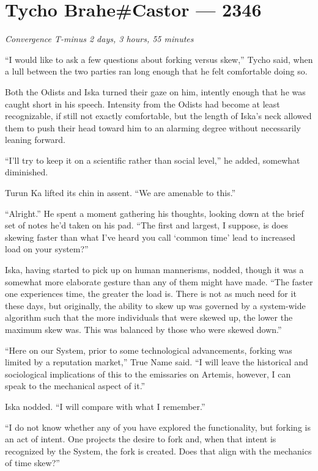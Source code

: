 \hypertarget{tycho-brahecastor-2346}{%
\chapter{Tycho Brahe\#Castor — 2346}}

\begin{center}
\emph{Convergence T-minus 2 days, 3 hours, 55 minutes}
\end{center}

\noindent ``I would like to ask a few questions about forking versus skew,'' Tycho said, when a lull between the two parties ran long enough that he felt comfortable doing so.

Both the Odists and Iska turned their gaze on him, intently enough that he was caught short in his speech. Intensity from the Odists had become at least recognizable, if still not exactly comfortable, but the length of Iska's neck allowed them to push their head toward him to an alarming degree without necessarily leaning forward.

``I'll try to keep it on a scientific rather than social level,'' he added, somewhat diminished.

Turun Ka lifted its chin in assent. ``We are amenable to this.''

``Alright.'' He spent a moment gathering his thoughts, looking down at the brief set of notes he'd taken on his pad. ``The first and largest, I suppose, is does skewing faster than what I've heard you call `common time' lead to increased load on your system?''

Iska, having started to pick up on human mannerisms, nodded, though it was a somewhat more elaborate gesture than any of them might have made. ``The faster one experiences time, the greater the load is. There is not as much need for it these days, but originally, the ability to skew up was governed by a system-wide algorithm such that the more individuals that were skewed up, the lower the maximum skew was. This was balanced by those who were skewed down.''

``Here on our System, prior to some technological advancements, forking was limited by a reputation market,'' True Name said. ``I will leave the historical and sociological implications of this to the emissaries on Artemis, however, I can speak to the mechanical aspect of it.''

Iska nodded. ``I will compare with what I remember.''

``I do not know whether any of you have explored the functionality, but forking is an act of intent. One projects the desire to fork and, when that intent is recognized by the System, the fork is created. Does that align with the mechanics of time skew?''

